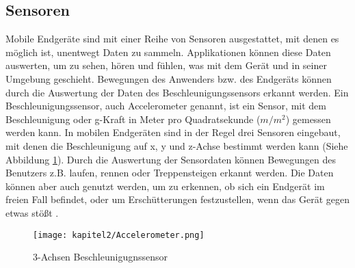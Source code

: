 \subsection{Sensoren}
Mobile Endgeräte sind mit einer Reihe von Sensoren ausgestattet, mit denen es möglich ist, unentwegt Daten zu sammeln. Applikationen können diese Daten auswerten, um zu sehen, hören und fühlen, was mit dem Gerät und in seiner Umgebung geschieht. Bewegungen des Anwenders bzw. des Endgeräts können durch die Auswertung der Daten des Beschleunigungssensors erkannt werden. Ein Beschleunigungssensor, auch Accelerometer genannt, ist ein Sensor, mit dem Beschleunigung oder g-Kraft in Meter pro Quadratsekunde ($m/m^{2}$) gemessen werden kann. In mobilen Endgeräten sind in der Regel drei Sensoren eingebaut, mit denen die Beschleunigung auf x, y und z-Achse bestimmt werden kann (Siehe Abbildung \ref{fig:Beschleunigungssensor}). Durch die Auswertung der Sensordaten können Bewegungen des Benutzers z.B. laufen, rennen oder Treppensteigen erkannt werden. Die Daten können aber auch genutzt werden, um zu erkennen, ob sich ein Endgerät im freien Fall befindet, oder um Erschütterungen festzustellen, wenn das Gerät gegen etwas stößt \cite{ravi2005activity}. 

\begin{figure}[H]
    \centering
    \texttt{[image: kapitel2/Accelerometer.png]}
    \caption{3-Achsen Beschleunigugnssensor \cite{AppleAccelerometer:Online}}
    \label{fig:Beschleunigungssensor}
\end{figure}